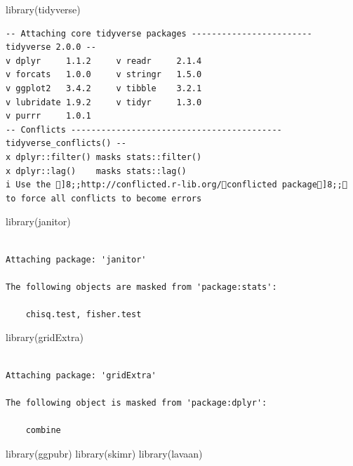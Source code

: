 \documentclass[
  letterpaper,
  DIV=11,
  numbers=noendperiod]{scrartcl}
\newenvironment{Shaded}{\begin{snugshade}}{\end{snugshade}}
\newcommand{\FunctionTok}[1]{\textcolor[rgb]{0.02,0.16,0.49}{#1}}
\newcommand{\NormalTok}[1]{\textcolor[rgb]{0.00,0.44,0.13}{#1}}
\begin{document}
\begin{Shaded}
\begin{Highlighting}[]
\FunctionTok{library}\NormalTok{(tidyverse)}
\end{Highlighting}
\end{Shaded}

\begin{verbatim}
-- Attaching core tidyverse packages ------------------------ tidyverse 2.0.0 --
v dplyr     1.1.2     v readr     2.1.4
v forcats   1.0.0     v stringr   1.5.0
v ggplot2   3.4.2     v tibble    3.2.1
v lubridate 1.9.2     v tidyr     1.3.0
v purrr     1.0.1     
-- Conflicts ------------------------------------------ tidyverse_conflicts() --
x dplyr::filter() masks stats::filter()
x dplyr::lag()    masks stats::lag()
i Use the ]8;;http://conflicted.r-lib.org/conflicted package]8;; to force all conflicts to become errors
\end{verbatim}

\begin{Shaded}
\begin{Highlighting}[]
\FunctionTok{library}\NormalTok{(janitor)}
\end{Highlighting}
\end{Shaded}

\begin{verbatim}

Attaching package: 'janitor'

The following objects are masked from 'package:stats':

    chisq.test, fisher.test
\end{verbatim}

\begin{Shaded}
\begin{Highlighting}[]
\FunctionTok{library}\NormalTok{(gridExtra)}
\end{Highlighting}
\end{Shaded}

\begin{verbatim}

Attaching package: 'gridExtra'

The following object is masked from 'package:dplyr':

    combine
\end{verbatim}

\begin{Shaded}
\begin{Highlighting}[]
\FunctionTok{library}\NormalTok{(ggpubr)}
\FunctionTok{library}\NormalTok{(skimr)}
\FunctionTok{library}\NormalTok{(lavaan)}
\end{Highlighting}
\end{Shaded}
\end{document}

